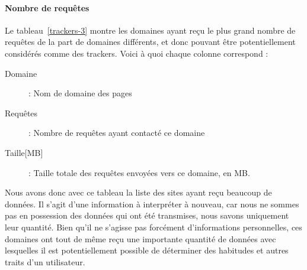 			\paragraph{Nombre de requêtes} Le tableau~\ref{trackers-3} montre les domaines ayant reçu le plus grand nombre de requêtes de la part de domaines différents, et donc pouvant être potentiellement considérés comme des trackers. Voici à quoi chaque colonne correspond :
			\begin{description}
				\item[Domaine] : Nom de domaine des pages
				\item[Requêtes] : Nombre de requêtes ayant contacté ce domaine
				\item[Taille{[}MB{]}] : Taille totale des requêtes envoyées vers ce domaine, en MB.
			\end{description}

			Nous avons donc avec ce tableau la liste des sites ayant reçu beaucoup de données. Il s'agit d'une information à interpréter à nouveau, car nous ne sommes pas en possession des données qui ont été transmises, nous savons uniquement leur quantité. Bien qu'il ne s'agisse pas forcément d'informations personnelles, ces domaines ont tout de même reçu une importante quantité de données avec lesquelles il est potentiellement possible de déterminer des habitudes et autres traits d'un utilisateur.

